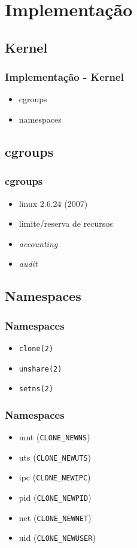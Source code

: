\documentclass{beamer}
\begin{document}
\section{Implementação}

\subsection{Kernel}

\begin{frame}
    \frametitle{Implementação - Kernel}
    \begin{itemize}
        \item cgroups
        \item namespaces
    \end{itemize}
\end{frame}

\subsection{cgroups}

\begin{frame}
    \frametitle{cgroups}
    \begin{itemize}
        \item linux 2.6.24 (2007)
        \item limite/reserva de recursos
        \item \textit{accounting}
        \item \textit{audit}
    \end{itemize}
\end{frame}

\subsection{Namespaces}

\begin{frame}
    \frametitle{Namespaces}
    \begin{itemize}
        \item \texttt{clone(2)}
        \item \texttt{unshare(2)}
        \item \texttt{setns(2)}
    \end{itemize}
\end{frame}

\begin{frame}
    \frametitle{Namespaces}
    \begin{itemize}
        \item mnt (\texttt{CLONE\_NEWNS})
        \item uts (\texttt{CLONE\_NEWUTS})
        \item ipc (\texttt{CLONE\_NEWIPC})
        \item pid (\texttt{CLONE\_NEWPID})
        \item net (\texttt{CLONE\_NEWNET})
        \item uid (\texttt{CLONE\_NEWUSER})
    \end{itemize}
\end{frame}
\end{document}
